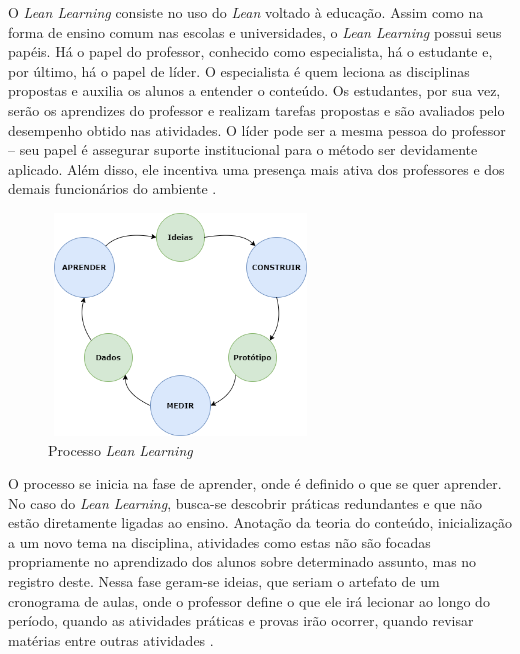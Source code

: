 O \textit{Lean Learning} consiste no uso do \textit{Lean} voltado à educação. Assim como na forma de ensino comum nas escolas e universidades, o \textit{Lean Learning} possui seus papéis. Há o papel do professor, conhecido como especialista, há o estudante e, por último, há o papel de líder. O especialista é quem leciona as disciplinas propostas e auxilia os alunos a entender o conteúdo. Os estudantes, por sua vez, serão os aprendizes do professor e realizam tarefas propostas e são avaliados pelo desempenho obtido nas atividades. O líder pode ser a mesma pessoa do professor -- seu papel é assegurar suporte institucional para o método ser devidamente aplicado. Além disso, ele incentiva uma presença mais ativa dos professores e dos demais funcionários do ambiente \cite{chatley2017lean} \cite{madruga2018}.

\begin{figure}
    \centering
    \includegraphics[width=7cm,height=5.9cm]{Imagens/Lean.png}
    \caption{Processo \textit{Lean Learning}}
    \label{fig:Processo}
\end{figure}

O processo se inicia na fase de aprender, onde é definido o que se quer aprender. No caso do \textit{Lean Learning}, busca-se descobrir práticas redundantes e que não estão diretamente ligadas ao ensino. Anotação da teoria do conteúdo, inicialização a um novo tema na disciplina, atividades como estas não são focadas propriamente no aprendizado dos alunos sobre determinado assunto, mas no registro deste. Nessa fase geram-se ideias, que seriam o artefato de um cronograma de aulas, onde o professor define o que ele irá lecionar ao longo do período, quando as atividades práticas e provas irão ocorrer, quando revisar matérias entre outras atividades \cite{LeanStartup2016}.

